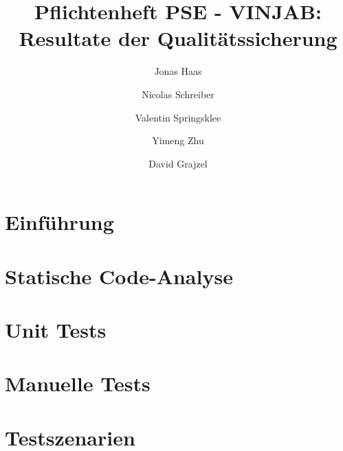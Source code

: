 \documentclass[a4paper,oneside,10pt]{report}
\begin{document}
\pagestyle{empty}


\title{Pflichtenheft PSE - VINJAB: Resultate der Qualitätssicherung}
\author{Jonas Haas 
			\and Nicolas Schreiber
			\and Valentin Springsklee
			\and Yimeng Zhu
			\and David Grajzel}
\maketitle

\tableofcontents %
\cleardoublepage %

\pagestyle{plain} %



\chapter{Einführung}\label{einfuehrung}


\newpage


\chapter{Statische Code-Analyse}\label{statischeanalyse}


\newpage


\chapter{Unit Tests}\label{unittests}


\newpage 

\newpage

\newpage

\newpage

\newpage

\newpage

\newpage


\chapter{Manuelle Tests}\label{manuelletests}


\newpage


\chapter{Testszenarien}\label{testszenarien}
\end{document}
